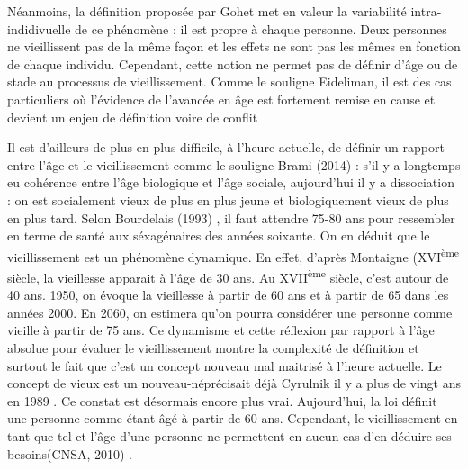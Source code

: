 Néanmoins, la définition proposée par Gohet met en valeur la variabilité intra-indidivuelle de ce phénomène : il est propre à chaque personne. Deux personnes ne vieillissent pas de la même façon et les effets ne sont pas les mêmes en fonction de chaque individu. Cependant, cette notion ne permet pas de définir d'âge ou de stade au processus de vieillissement. Comme le souligne Eideliman, \og il est des cas particuliers où l'évidence de l'avancée en âge est fortement remise en cause et devient un enjeu de définition voire de conflit\fg{}


Il est d'ailleurs de plus en plus difficile, à l'heure actuelle, de définir un rapport entre l'âge et le vieillissement comme le souligne Brami (2014) \cite{Brami2014} : \og s’il y a longtemps eu cohérence entre l’âge biologique et l’âge sociale, aujourd’hui il y a dissociation : on est socialement vieux de plus en plus jeune et biologiquement vieux de plus en plus tard\fg . Selon Bourdelais (1993) \cite{Bourdelais1993}, il faut attendre 75-80 ans pour ressembler en terme de santé aux séxagénaires des années soixante. On en déduit que le vieillissement est un phénomène dynamique.
En effet, d'après Montaigne (XVI\textsuperscript{ème} siècle, la vieillesse apparait à l'âge de 30 ans. Au XVII\textsuperscript{ème} siècle, c'est autour de 40 ans. 1950, on évoque la vieillesse à partir de 60 ans et à partir de 65 dans les années 2000. En 2060, on estimera qu'on pourra considérer une personne comme vieille à partir de 75 ans. Ce dynamisme et cette réflexion par rapport à l'âge absolue pour évaluer le vieillissement montre la complexité de définition et surtout le fait que c'est un concept nouveau mal maitrisé à l'heure actuelle. \og Le concept de vieux est un nouveau-né\fg précisait déjà Cyrulnik il y a plus de vingt ans en 1989 \cite{Cyrulnik1989}. Ce constat est désormais encore plus vrai. Aujourd'hui, la loi définit une personne comme étant âgé à partir de 60 ans. Cependant, \og le vieillissement en tant que tel et l’âge d’une personne ne permettent en aucun cas d’en déduire ses besoins\fg (CNSA, 2010) \cite{CNSA2010}.

